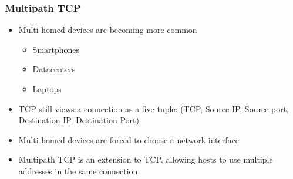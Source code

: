 \documentclass{beamer}
\begin{document}
\begin{frame}
  \frametitle{Multipath TCP}

  \begin{itemize}
  \item Multi-homed devices are becoming more common
    \begin{itemize}
    \item Smartphones
    \item Datacenters
    \item Laptops
    \end{itemize}
  \item TCP still views a connection as a five-tuple: (TCP, Source IP, Source
    port, Destination IP, Destination Port)
  \item Multi-homed devices are forced to choose a network interface
  \item Multipath TCP is an extension to TCP, allowing hosts to use multiple
    addresses in the same connection
  \end{itemize}
\end{frame}
\end{document}
